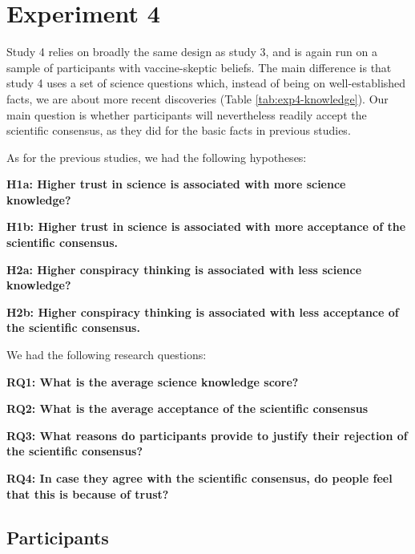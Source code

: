 \documentclass[
  doc,floatsintext]{apa6}
\begin{document}
\clearpage

\section{Experiment 4}\label{exp4}

Study 4 relies on broadly the same design as study 3, and is again run on a sample of participants with vaccine-skeptic beliefs. The main difference is that study 4 uses a set of science questions which, instead of being on well-established facts, we are about more recent discoveries (Table \ref{tab:exp4-knowledge}). Our main question is whether participants will nevertheless readily accept the scientific consensus, as they did for the basic facts in previous studies.

As for the previous studies, we had the following hypotheses:

\textbf{H1a: Higher trust in science is associated with more science knowledge?}

\textbf{H1b: Higher trust in science is associated with more acceptance of the scientific consensus.}

\textbf{H2a: Higher conspiracy thinking is associated with less science knowledge?}

\textbf{H2b: Higher conspiracy thinking is associated with less acceptance of the scientific consensus.}

We had the following research questions:

\textbf{RQ1: What is the average science knowledge score?}

\textbf{RQ2: What is the average acceptance of the scientific consensus}

\textbf{RQ3: What reasons do participants provide to justify their rejection of the scientific consensus?}

\textbf{RQ4: In case they agree with the scientific consensus, do people feel that this is because of trust?}

\subsection{Participants}\label{participants-4}
\end{document}
